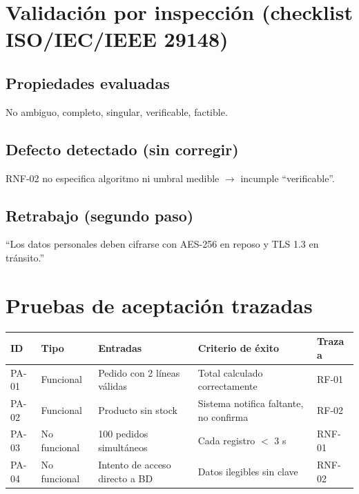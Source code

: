 \documentclass[11pt,a4paper]{article}
\begin{document}
\newpage

\section{Validación por inspección (checklist ISO/IEC/IEEE 29148)}

\subsection*{Propiedades evaluadas}
No ambiguo, completo, singular, verificable, factible.

\subsection*{Defecto detectado (sin corregir)}
RNF-02 no especifica algoritmo ni umbral medible $\rightarrow$ incumple ``verificable''.

\subsection*{Retrabajo (segundo paso)}
``Los datos personales deben cifrarse con AES-256 en reposo y TLS 1.3 en tránsito.''

\newpage

\section{Pruebas de aceptación trazadas}

\begin{center}
\begin{tabular}{p{1.3cm}p{1.8cm}p{3.2cm}p{4.2cm}p{1.5cm}}
\toprule
\textbf{ID} & \textbf{Tipo} & \textbf{Entradas} & \textbf{Criterio de éxito} & \textbf{Traza a} \\
\midrule
PA-01 & Funcional     & Pedido con 2 líneas válidas         & Total calculado correctamente             & RF-01 \\
PA-02 & Funcional     & Producto sin stock                  & Sistema notifica faltante, no confirma    & RF-02 \\
PA-03 & No funcional  & 100 pedidos simultáneos             & Cada registro $<$ 3 s                     & RNF-01 \\
PA-04 & No funcional  & Intento de acceso directo a BD      & Datos ilegibles sin clave                 & RNF-02 \\
\bottomrule
\end{tabular}
\end{center}
\end{document}
